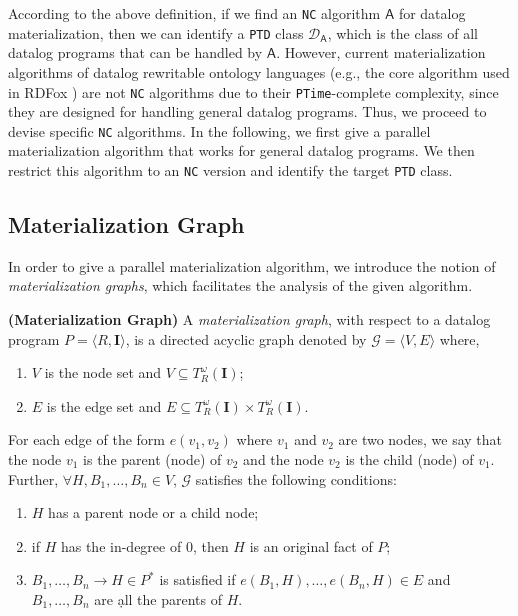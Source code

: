 According to the above definition, if we find an \texttt{NC} algorithm $\mathsf{A}$
for datalog materialization, then we can identify a \texttt{PTD} class $\mathcal{D}_{\mathsf{A}}$,
which is the class of all datalog programs that can be handled by $\mathsf{A}$.
However, current materialization algorithms of datalog rewritable ontology languages
(e.g., the core algorithm used in RDFox \cite{MotikNPHO14}) are not \texttt{NC} algorithms
due to their \texttt{PTime}-complete complexity, since they are
designed for handling general datalog programs. Thus, we proceed to
devise specific \texttt{NC} algorithms.
In the following, we first give a parallel materialization algorithm that works for
general datalog programs. We then restrict this algorithm to an \texttt{NC} version
and identify the target \texttt{PTD} class.


\subsection{Materialization Graph}

In order to give a parallel materialization algorithm,
we introduce the notion of \emph{materialization graphs}, which
facilitates the analysis of the given algorithm.

\begin{definition}
\textbf{(Materialization Graph)}\label{def:mg}
A \emph{materialization graph}, with respect to
a datalog program $P=\langle R, \textbf{I}\rangle$, is a directed acyclic graph
denoted by $\mathcal{G}=\langle V, E\rangle$ where,
\begin{enumerate}[leftmargin=4ex,label=$\bullet$]
  \item $V$ is the node set and $V\subseteq T_R^{\omega}(\textbf{I})$;
  \item $E$ is the edge set and $E\subseteq T_R^{\omega}(\textbf{I})\times T_R^{\omega}(\textbf{I})$.
\end{enumerate}
For each edge of the form $e(v_1, v_2)$ where $v_1$ and $v_2$ are two nodes,
we say that the node $v_1$ is the parent (node) of $v_2$ and the node $v_2$ is the child (node)
of $v_1$. Further, $\forall H,B_1,\ldots,B_n\in V$, $\mathcal{G}$ satisfies the following conditions:
\begin{enumerate}[leftmargin=4ex,label=$\bullet$]
  \item $H$ has a parent node or a child node;
  \item if $H$ has the in-degree of $0$, then $H$ is an original fact of $P$;
  \item $B_1,\ldots,B_n\rightarrow H\in P^*$ is satisfied if $e(B_1, H),\ldots,e(B_n, H)\in E$ and
  $B_1,\ldots,B_n$ are \d{all} the parents of $H$.
\end{enumerate}
\end{definition}

